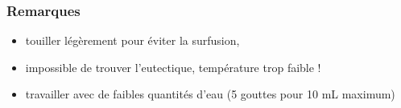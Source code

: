 \documentclass[11pt,a4paper]{report}
\begin{document}
\subsubsection*{Remarques}
\begin{itemize}
	\item touiller légèrement pour éviter la surfusion,
	\item impossible de trouver l'eutectique, température trop faible !
	\item travailler avec de faibles quantités d'eau (5 gouttes pour 10 mL maximum)
\end{itemize}
\end{document}
